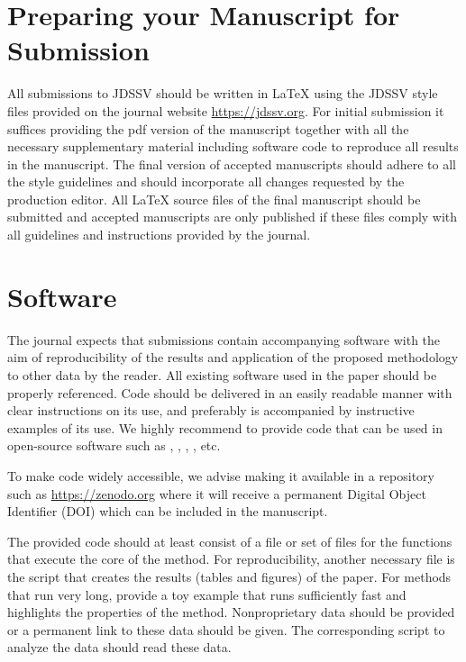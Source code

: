 \documentclass[article]{jdssv}
\begin{document}
\section[]{Preparing your Manuscript for Submission}

All submissions to JDSSV should be written in {\LaTeX} using the JDSSV style files provided on the journal website \url{https://jdssv.org}. For initial submission it suffices providing the pdf version of the manuscript together with all the necessary supplementary material including software code to reproduce all results in the manuscript. The final version of accepted manuscripts should adhere to all the style guidelines and should incorporate all changes requested by the production editor. All {\LaTeX}  source files of the final manuscript should be submitted and accepted manuscripts are only published if these files comply with all guidelines and instructions provided by the journal. 



\section[]{Software}

The journal expects that submissions contain accompanying
software with the aim of reproducibility of the results and application of the proposed methodology to other data by the reader.  All existing software used in the paper should be properly referenced. Code should be delivered in an easily readable manner with clear instructions on its use, and preferably is accompanied by instructive examples of its use. We highly recommend to provide code that can be used in open-source software such as  \citep{R},  \citep{python},  \citep{Julia},  \citep{octave}, etc. 

To make code widely accessible, we advise making it available in a repository such as \url{https://zenodo.org} where it will receive a permanent Digital Object Identifier (DOI) which can be included in the manuscript. 

The provided code should at least consist of a file or set of files for the functions that execute the core of the method. For reproducibility, another necessary file is the script that creates the results (tables and figures) of the paper. For methods that run very long, provide a toy example that runs sufficiently fast and highlights the properties of the method. Nonproprietary data should be provided or a permanent link to these data should be given. The corresponding script to analyze the data should read these data. 
\end{document}
